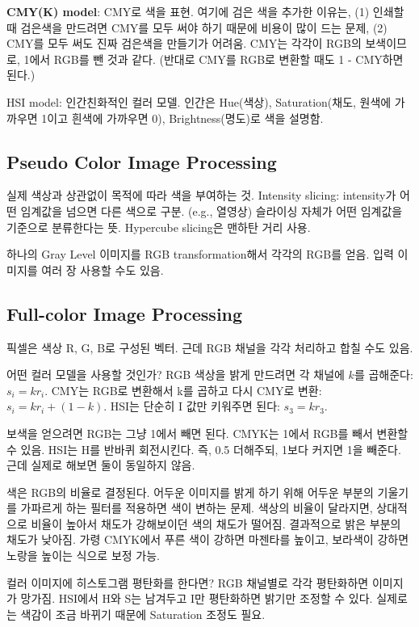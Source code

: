 \textbf{CMY(K) model}: CMY로 색을 표현. 여기에 검은 색을 추가한 이유는, (1) 인쇄할 때 검은색을 만드려면 CMY를 모두 써야 하기 때문에 비용이 많이 드는 문제, (2) CMY를 모두 써도 진짜 검은색을 만들기가 어려움. CMY는 각각이 RGB의 보색이므로, 1에서 RGB를 뺀 것과 같다. (반대로 CMY를 RGB로 변환할 때도 1 - CMY하면 된다.)

HSI model: 인간친화적인 컬러 모델. 인간은 Hue(색상), Saturation(채도, 원색에 가까우면 1이고 흰색에 가까우면 0), Brightness(명도)로 색을 설명함.

\subsection{Pseudo Color Image Processing}

실제 색상과 상관없이 목적에 따라 색을 부여하는 것. Intensity slicing: intensity가 어떤 임계값을 넘으면 다른 색으로 구분. (e.g., 열영상) 슬라이싱 자체가 어떤 임계값을 기준으로 분류한다는 뜻. Hypercube slicing은 맨하탄 거리 사용.

하나의 Gray Level 이미지를 RGB transformation해서 각각의 RGB를 얻음. 입력 이미지를 여러 장 사용할 수도 있음.

\subsection{Full-color Image Processing}

픽셀은 색상 R, G, B로 구성된 벡터. 근데 RGB 채널을 각각 처리하고 합칠 수도 있음.

어떤 컬러 모델을 사용할 것인가? RGB 색상을 밝게 만드려면 각 채널에 $k$를 곱해준다: $s_i = kr_i$. CMY는 RGB로 변환해서 k를 곱하고 다시 CMY로 변환: $s_i = kr_i + (1 - k)$. HSI는 단순히 I 값만 키워주면 된다: $s_3 = kr_3$.

보색을 얻으려면 RGB는 그냥 1에서 빼면 된다. CMYK는 1에서 RGB를 빼서 변환할 수 있음. HSI는 H를 반바퀴 회전시킨다. 즉, 0.5 더해주되, 1보다 커지면 1을 빼준다. 근데 실제로 해보면 둘이 동일하지 않음.

색은 RGB의 비율로 결정된다. 어두운 이미지를 밝게 하기 위해 어두운 부분의 기울기를 가파르게 하는 필터를 적용하면 색이 변하는 문제. 색상의 비율이 달라지면, 상대적으로 비율이 높아서 채도가 강해보이던 색의 채도가 떨어짐. 결과적으로 밝은 부분의 채도가 낮아짐. 가령 CMYK에서 푸른 색이 강하면 마젠타를 높이고, 보라색이 강하면 노랑을 높이는 식으로 보정 가능.

컬러 이미지에 히스토그램 평탄화를 한다면? RGB 채널별로 각각 평탄화하면 이미지가 망가짐. HSI에서 H와 S는 남겨두고 I만 평탄화하면 밝기만 조정할 수 있다. 실제로는 색감이 조금 바뀌기 때문에 Saturation 조정도 필요.

